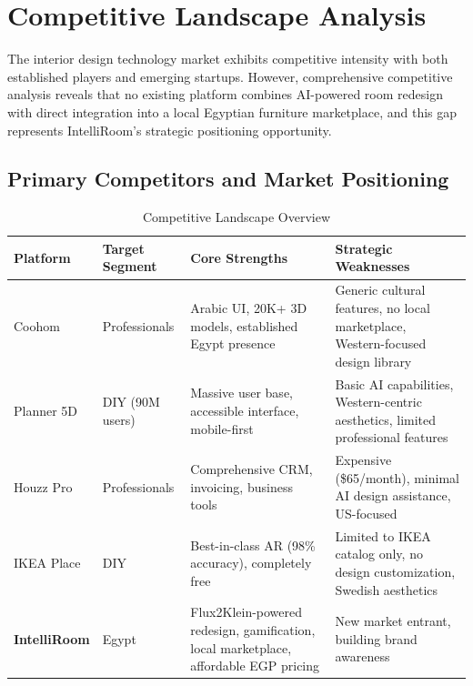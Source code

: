 \clearpage

\section{Competitive Landscape Analysis}
\label{sec:app_competitors}

The interior design technology market exhibits competitive intensity with both established players and emerging startups. However, comprehensive competitive analysis reveals that no existing platform combines AI-powered room redesign with direct integration into a local Egyptian furniture marketplace, and this gap represents IntelliRoom's strategic positioning opportunity.

\subsection{Primary Competitors and Market Positioning}

\begin{table}[htbp]
\centering
\caption{Competitive Landscape Overview}
\label{tab:competitor_analysis}
\begin{tabular}{p{2cm}p{2.5cm}p{4.5cm}p{4cm}}
\toprule
\textbf{Platform} & \textbf{Target Segment} & \textbf{Core Strengths} & \textbf{Strategic Weaknesses} \\
\midrule
Coohom & Professionals & Arabic UI, 20K+ 3D models, established Egypt presence & Generic cultural features, no local marketplace, Western-focused design library \\
Planner 5D & DIY (90M users) & Massive user base, accessible interface, mobile-first & Basic AI capabilities, Western-centric aesthetics, limited professional features \\
Houzz Pro & Professionals & Comprehensive CRM, invoicing, business tools & Expensive (\$65/month), minimal AI design assistance, US-focused \\
IKEA Place & DIY & Best-in-class AR (98\% accuracy), completely free & Limited to IKEA catalog only, no design customization, Swedish aesthetics \\
\textbf{IntelliRoom} & Egypt & Flux2Klein-powered redesign, gamification, local marketplace, affordable EGP pricing & New market entrant, building brand awareness \\
\bottomrule
\end{tabular}
\end{table}


